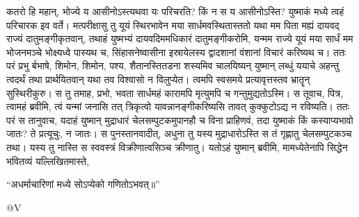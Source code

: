 \vakya कतरो हि महान्, भोज्ये य आसीनोऽस्त्यथवा यः परिचरति? किं न स य आसीनोऽस्ति? युष्माकं मध्ये त्वहं परिचारक इव वर्ते।
\vakya मत्परीक्षासु तु यूयं स्थिरभावेन मया सार्धमवस्थितास्ततो
\vakya यथा मम पिता मह्यं दायवद् राज्यं दातुमङ्गीकृतवान्, तथाहं युष्मभ्यं दायवदिममधिकारं दातुमङ्गीकरोमि,
\vakya यन्मम राज्ये यूयं मया सार्धं मम भोजनमञ्चे भोक्ष्यध्वे पास्यथ च, सिंहासनेष्वासीना इस्रायेलस्य द्वादशानां वंशानां विचारं करिष्यथ च।
\vakya ततः परं प्रभु र्बभाषे, शिमोन, शिमोन, पश्य, शैतानस्तितडना शस्यमिव चालयिष्यन् युष्मान् लब्धुं ययाचे
\vakya अहन्तु त्वदर्थं तथा प्रार्थयितवान् यथा तव विश्वासो न विलुप्येत। त्वमपि स्वसमये प्रत्यावृत्तस्तव भ्रातॄन् सुस्थिरीकुरु।
\vakya स तु तमाह, प्रभो, भवता सार्धमहं कारामपि मृत्युमपि च गन्तुमुद्यतोऽस्मि।
\vakya स तूवाच, पित्र, त्वामहं ब्रवीमि, त्वं यन्मां जनासि तत् त्रिकृत्वो यावन्नानङ्गीकरिष्यसि तावत् कुक्कुटोऽद्य न रविष्यति।
\vakya ततः परं स तानुवाच, यदाहं युष्मान् मुद्राधारं चेलसम्पुटकमुपानहौ च विना प्राहिणवं, तदा युष्माकं किं कस्याप्यभावो जातः? ते प्रत्यूचुः, न जातः।
\vakya स पुनस्तानवादीत्, अधुना तु यस्य मुद्राधारोऽस्ति स तं गृह्णातु चेलसम्पुटकञ्च तथा।
\vakya यस्य तु नास्ति स स्ववस्त्रं विक्रीणात्वसिञ्च क्रीणातु। यतोऽहं युष्मान् ब्रवीमि, मामध्येतेनापि सिद्धेन भवितव्यं यल्लिखितमास्ते,
\begin{poem}
\startwithline “अधर्माचारिणां मध्ये सोऽप्येको गणितोऽभवत्॥”
\end{poem}
@V\eoc